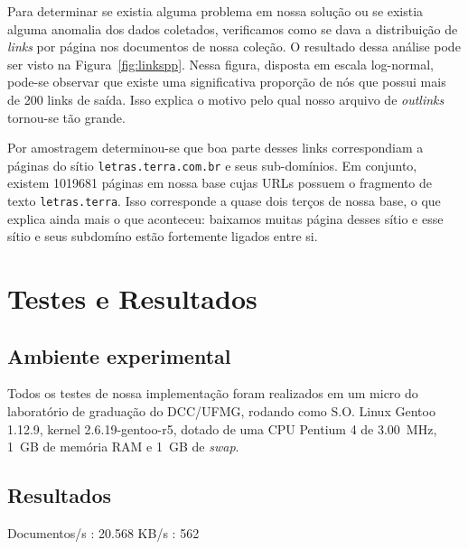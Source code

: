 \documentclass[10pt,twocolumn]{article}
\begin{document}
Para determinar se existia alguma problema em nossa solução ou se
existia alguma anomalia dos dados coletados, verificamos como se dava a
distribuição de \emph{links} por página nos documentos de nossa coleção.
O resultado dessa análise pode ser visto na Figura~\ref{fig:linkspp}.
Nessa figura, disposta em escala log-normal, pode-se observar que existe
uma significativa proporção de nós que possui mais de 200 links de
saída. Isso explica o motivo pelo qual nosso arquivo de \emph{outlinks}
tornou-se tão grande.

Por amostragem determinou-se que boa parte desses links correspondiam a
páginas do sítio \texttt{letras.terra.com.br} e seus sub-domínios. Em
conjunto, existem 1019681 páginas em nossa base cujas URLs possuem o
fragmento de texto \texttt{letras.terra}. Isso corresponde a quase dois
terços de nossa base, o que explica ainda mais o que aconteceu: baixamos
muitas página desses sítio e esse sítio e seus subdomíno estão
fortemente ligados entre si.


\section{Testes e Resultados}

\subsection{Ambiente experimental}

Todos os testes de nossa implementação foram realizados em um micro do
laboratório de graduação do DCC/UFMG, rodando como S.O. Linux Gentoo
1.12.9, kernel 2.6.19-gentoo-r5, dotado de uma CPU Pentium 4 de
3.00~MHz, 1~GB de memória RAM e 1~GB de \emph{swap}.

\subsection{Resultados}

Documentos/s : 20.568
KB/s : 562
\end{document}
